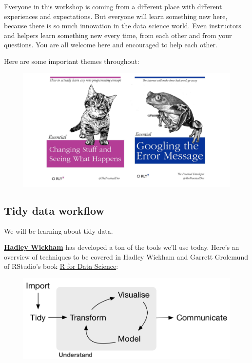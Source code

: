 \documentclass[]{book}
\theoremstyle{definition}
\theoremstyle{definition}
\theoremstyle{definition}
\theoremstyle{remark}
\begin{document}
Everyone in this workshop is coming from a different place with
different experiences and expectations. But everyone will learn
something new here, because there is so much innovation in the data
science world. Even instructors and helpers learn something new every
time, from each other and from your questions. You are all welcome here
and encouraged to help each other.

Here are some important themes throughout:

\begin{figure}[htbp]
\centering
\includegraphics{img/practical_dev_both.png}
\caption{}
\end{figure}

\subsection{Tidy data workflow}\label{tidy-data-workflow}

We will be learning about tidy data.

\href{http://hadley.nz/}{\textbf{Hadley Wickham}} has developed a ton of
the tools we'll use today. Here's an overview of techniques to be
covered in Hadley Wickham and Garrett Grolemund of RStudio's book
\href{http://r4ds.had.co.nz/}{R for Data Science}:

\begin{figure}[htbp]
\centering
\includegraphics{img/r4ds_data-science.png}
\caption{}
\end{figure}
\end{document}
